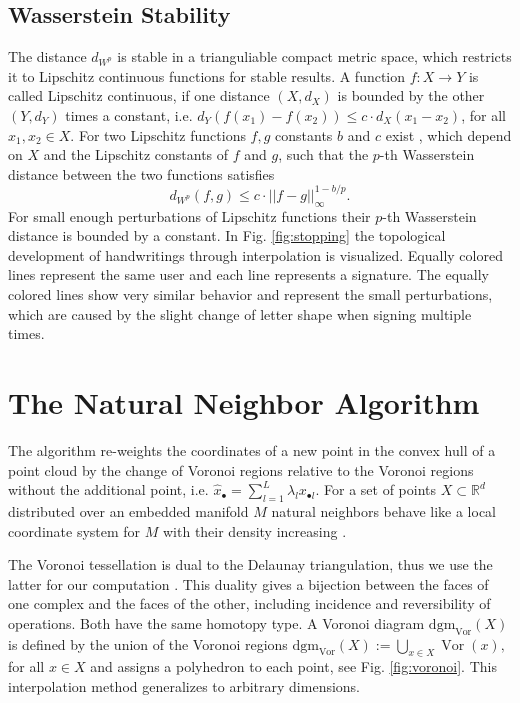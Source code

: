 \documentclass[runningheads]{llncs}
\DeclareMathOperator{\Vor}{\text{Vor}}
\begin{document}
\subsection{Wasserstein Stability}
The distance $d_{W^p}$ is stable in a trianguliable compact metric space, which restricts it to Lipschitz continuous functions for stable results. A function $f: X \rightarrow Y$ is called Lipschitz continuous, if one distance $(X,d_X)$ is bounded by the other $(Y,d_Y)$ times a constant, i.e. $d_Y(f(x_1) - f(x_2)) \leq c \cdot d_X(x_1-x_2)$, for all $x_1, x_2 \in X.$ For two Lipschitz functions $f,g$ constants $b$ and $c$ exist \cite{cohen2010lipschitz}, which depend on $X$ and the Lipschitz constants of $f$ and $g$, such that the $p$-th Wasserstein distance between the two functions satisfies
\begin{equation}
  d_{W^p}(f,g) \leq c \cdot ||f-g||_\infty^{1-b/p}.
\end{equation}
For small enough perturbations of Lipschitz functions their $p$-th Wasserstein distance is bounded by a constant. In Fig. \ref{fig:stopping} the topological development of handwritings through interpolation is visualized. Equally colored lines represent the same user and each line represents a signature. The equally colored lines show very similar behavior and represent the small perturbations, which are caused by the slight change of letter shape when signing multiple times.

\section{The Natural Neighbor Algorithm}
\label{sec:natneighbor}

The algorithm re-weights the coordinates of a new point in the convex hull of a point cloud by the change of Voronoi regions relative to the Voronoi regions without the additional point, i.e. $\hat{x}_{\bullet} = \sum_{l=1}^{L} \lambda_l x_{\bullet l}$. For a set of points $X \subset \mathbb{R}^d$ distributed over an embedded manifold $M$ natural neighbors behave like a local coordinate system for $M$ with their density increasing \cite{BoissonnatC01}.

The Voronoi tessellation is dual to the Delaunay triangulation, thus we use the latter for our computation \cite[pp.~45-47]{BoissonnatDG18}. This duality gives a bijection between the faces of one complex and the faces of the other, including incidence and reversibility of operations. Both have the same homotopy type. A Voronoi diagram $\text{dgm}_{\Vor}(X)$ is defined by the union of the Voronoi regions $\text{dgm}_{\Vor}(X) := \bigcup_{x \in X} \Vor(x),$ for all $x \in X$ and assigns a polyhedron to each point, see Fig. \ref{fig:voronoi}. This interpolation method generalizes to arbitrary dimensions.
\end{document}
